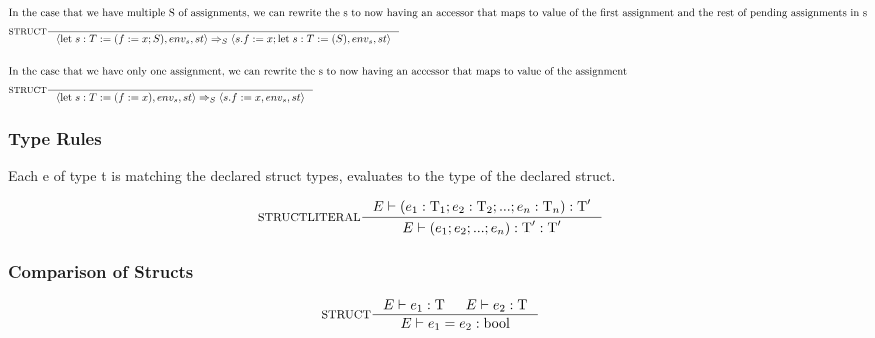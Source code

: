 \begin{align*}
\intertext{In the case that we have multiple S of assignments, we can rewrite the s to now having an accessor that maps to value of the first assignment and the rest of pending assignments in s}
&\inference[$\text{STRUCT}$]{}
                            {\Braket{\Tlet \; s:T := (f := x;S),env_s,st} \Rightarrow_S \Braket{s.f := x;\Tlet \; s:T := (S),env_s,st}}
\\\\
\intertext{In the case that we have only one assignment, we can rewrite the s to now having an accessor that maps to value of the assignment}
&\inference[$\text{STRUCT}$]{}
                            {\Braket{\Tlet \; s:T := (f := x),env_s,st} \Rightarrow_S \Braket{s.f := x,env_s,st}}
\end{align*}

\subsubsection{Type Rules}

Each e of type t is matching the declared struct types, evaluates to the type of the declared struct.

\begin{align*}
&\inference[STRUCTLITERAL]{\Tenv (e_1 : \Tt_1;e_2 : \Tt_2;...;e_n : \Tt_n):\Tt'}
                 {\Tenv \mathbin{\text{(}} e_1; e_2;...;e_n\mathbin{\text{)}}:\Tt': \Tt'}
\end{align*}

\subsubsection{Comparison of Structs}
\begin{align*}
&\inference[STRUCT]{\Tenv e_1: \Tt & \Tenv e_2: \Tt}
                 {\Tenv e_1 = e_2: \Tbool}
\end{align*}
